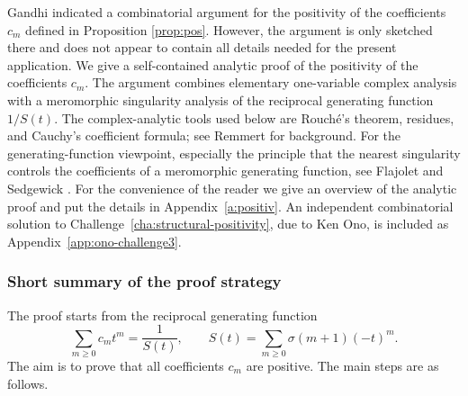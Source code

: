 \documentclass[11pt,reqno]{amsart}
\theoremstyle{plain}
\theoremstyle{remark}
\theoremstyle{definition}
\numberwithin{equation}{section}
\begin{document}
Gandhi \cite{Ga69} indicated a combinatorial argument for the positivity of the coefficients $c_m$
defined in Proposition \ref{prop:pos}.
However, the argument is only sketched there and does not appear to contain all details needed for the present application. 
We give a self-contained analytic proof of the positivity of the coefficients $c_m$. The argument combines elementary one-variable complex analysis with a meromorphic singularity analysis of the reciprocal generating function $1/S(t)$. The complex-analytic tools used below are 
Rouch\'e's theorem, residues, and Cauchy's coefficient formula; see Remmert \cite{Re91} for background. For the generating-function viewpoint, especially the principle that the nearest singularity controls the coefficients of a meromorphic generating function, see Flajolet and Sedgewick \cite{FS09}. For the convenience of the reader
we give an overview of the analytic proof and put the details in Appendix~\ref{a:positiv}. An independent combinatorial solution to Challenge~\ref{cha:structural-positivity}, due to Ken Ono, is included as Appendix~\ref{app:ono-challenge3}.

\subsubsection{Short summary of the proof strategy}
The proof starts from the reciprocal generating function
\[
  \sum_{m\geq 0} c_m t^m = \frac{1}{S(t)},
  \qquad
  S(t)=\sum_{m\geq 0} \sigma(m+1)(-t)^m .
\]
The aim is to prove that all coefficients $c_m$ are positive. The main steps are as follows.
\end{document}
